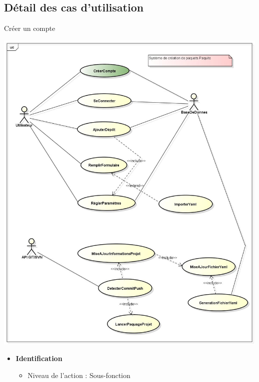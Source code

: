 \documentclass[9pt,xcolor=dvipsnames]{beamer}
\begin{document}
\subsection{Détail des cas d'utilisation}
\begin{frame}{Créer un compte}
  \begin{minipage}{0.40\textwidth}
    \begin{flushleft}
      \includegraphics[scale=\largeur]{../img/Diagram_creerCompte.jpg}
    \end{flushleft}
  \end{minipage}
  \hfill
  \begin{minipage}{0.5\textwidth}
    \begin{flushright}
      \begin{itemize} 
      \item \textbf{Identification} 
        \begin{itemize} 
        \item[] Niveau de l'action : Sous-fonction 

\end{itemize}
\end{itemize}
\end{flushright}
\end{minipage}
\end{frame}
\end{document}
